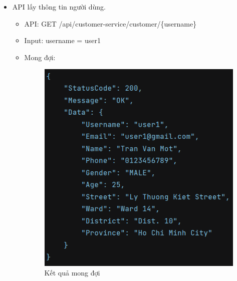 \newpage
\begin{itemize}
    \item API lấy thông tin người dùng.
          \begin{itemize}
              \item API: GET /api/customer-service/customer/\{username\}
              \item Input: username = user1
              \item Mong đợi:

                    \begin{figure}[!htp]
                        \begin{center}
                            \includegraphics[width=10cm]{img/testing/inte_expected_1.PNG}
                        \end{center}
                        \caption{Kết quả mong đợi}
                    \end{figure}


\end{itemize}
\end{itemize}
